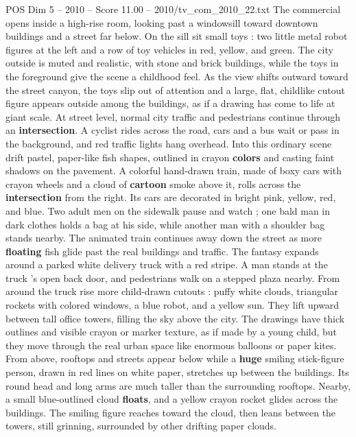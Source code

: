 \begin{textsample}{POS Dim 5 – 2010 – Score 11.00 – 2010/tv\_com\_2010\_22.txt}  \label{ex:f5_pos_044}
The commercial opens inside a high-rise room, looking past a windowsill toward downtown buildings and a street far below.
On the sill sit small toys : two little metal robot figures at the left and a row of toy vehicles in red, yellow, and green.
The city outside is muted and realistic, with stone and brick buildings, while the toys in the foreground give the scene a childhood feel.
As the view shifts outward toward the street canyon, the toys slip out of attention and a large, flat, childlike cutout figure appears outside among the buildings, as if a drawing has come to life at giant scale.
At street level, normal city traffic and pedestrians continue through an \textbf{intersection}.
A cyclist rides across the road, cars and a bus wait or pass in the background, and red traffic lights hang overhead.
Into this ordinary scene drift pastel, paper-like fish shapes, outlined in crayon \textbf{colors} and casting faint shadows on the pavement.
A colorful hand-drawn train, made of boxy cars with crayon wheels and a cloud of \textbf{cartoon} smoke above it, rolls across the \textbf{intersection} from the right.
Its cars are decorated in bright pink, yellow, red, and blue.
Two adult men on the sidewalk pause and watch ; one bald man in dark clothes holds a bag at his side, while another man with a shoulder bag stands nearby.
The animated train continues away down the street as more \textbf{floating} fish glide past the real buildings and traffic.
The fantasy expands around a parked white delivery truck with a red stripe.
A man stands at the truck ’s open back door, and pedestrians walk on a stepped plaza nearby.
From around the truck rise more child-drawn cutouts : puffy white clouds, triangular rockets with colored windows, a blue robot, and a yellow sun.
They lift upward between tall office towers, filling the sky above the city.
The drawings have thick outlines and visible crayon or marker texture, as if made by a young child, but they move through the real urban space like enormous balloons or paper kites.
From above, rooftops and streets appear below while a \textbf{huge} smiling stick-figure person, drawn in red lines on white paper, stretches up between the buildings.
Its round head and long arms are much taller than the surrounding rooftops.
Nearby, a small blue-outlined cloud \textbf{floats}, and a yellow crayon rocket glides across the buildings.
The smiling figure reaches toward the cloud, then leans between the towers, still grinning, surrounded by other drifting paper clouds.

\end{textsample}
